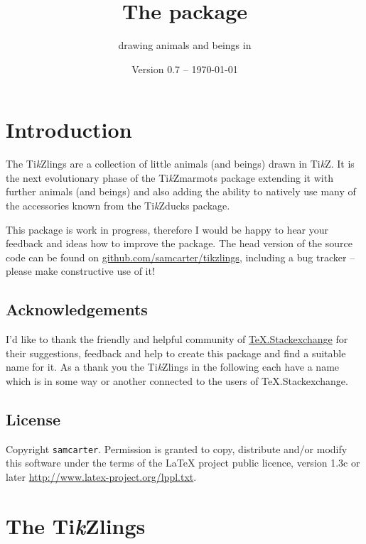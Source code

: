 \documentclass[parskip=half]{scrartcl}
\title{The \texorpdfstring{\tikzlings}{tikzlings} package}
\subtitle{drawing animals and beings in \TikZ}
\author{%
	\texorpdfstring{\texttt{samcarter} (alias 
		\tikzset{external/export=false}%
		\begin{tikzpicture}[scale=0.3,baseline=3pt]
			\duck[body=yellow!50!brown!50!white,
					longhair=red!50!brown, 
					jacket=blue!50!black]
		\end{tikzpicture})\\[0.8em]
		\url{https://github.com/samcarter/tikzlings}
	}{samcarter}}
\date{Version 0.7 -- \today}
\newcommand{\CTAN}{\textsc{CTAN}\xspace}
\newcommand{\TikZ}{Ti\emph{k}Z\xspace}
\newcommand{\tikzducks}{Ti\emph{k}Zducks\xspace}
\newcommand{\tikzmarmots}{Ti\emph{k}Zmarmots\xspace}
\newcommand{\tikzlings}{Ti\emph{k}Zlings\xspace}
\newcommand{\miktex}{MiK\TeX\xspace}
\newcommand{\texlive}{\TeX{}Live\xspace}
\begin{document}
\maketitle
\thispagestyle{scrheadings}

\section{Introduction}
\label{intro}

The \tikzlings are a collection of little animals (and beings) drawn in \TikZ. It is the next evolutionary phase of the \tikzmarmots package extending it with further animals (and beings) and also adding the ability to natively use many of the accessories known from the \tikzducks package. 

This package is work in progress, therefore I would be happy to hear your feedback and ideas how to improve the package. 
The head version of the source code can be found on \url{github.com/samcarter/tikzlings}, including a bug tracker -- please make constructive use of it! 

\subsection{Acknowledgements}

I'd like to thank the friendly and helpful community of \href{https://tex.stackexchange.com/}{TeX.Stackexchange} for their suggestions, feedback and help to create this package and find a suitable name for it. As a thank you the \tikzlings in the following each have a name which is in some way or another connected to the users of TeX.Stackexchange.

\subsection{License}

Copyright 
\texttt{samcarter}. Permission is granted to copy, distribute and\slash or modify this software under the terms of the LaTeX project public licence, version 1.3c or later \url{http://www.latex-project.org/lppl.txt}.

\section{The \tikzlings}
\end{document}
